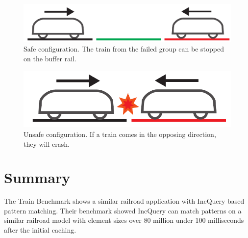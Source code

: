 \newpage
\begin{figure}[H]
	\centering
	\includegraphics[width=0.7\linewidth]{include/figures/chapter_6/failsafe/safe}
	\caption{Safe configuration. The train from the failed group can be stopped on the buffer rail.}
	\label{fig:case_study:safe}
\end{figure}

\begin{figure}[H]
	\centering
	\includegraphics[width=0.5\linewidth]{include/figures/chapter_6/failsafe/unsafe}
	\caption{Unsafe configuration. If a train comes in the opposing direction, they will crash.}
	\label{fig:case_study:unsafe}
\end{figure}

\section{Summary}

The Train Benchmark\cite{TrainBenchmark} shows a similar railroad application with IncQuery based pattern matching. Their benchmark showed IncQuery can match patterns on a similar railroad model with element sizes over 80 million under 100 milliseconds after the initial caching.